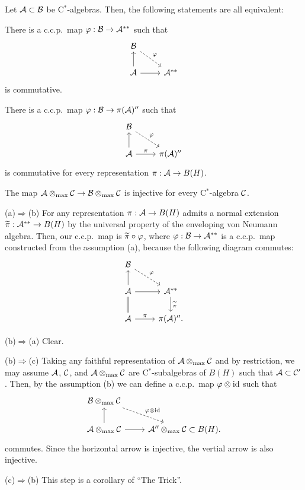 \documentclass{../../small}
\begin{document}
\begin{cor}
Let $\mathcal{A}\subset\mathcal{B}$ be C$^*$-algebras.
Then, the following statements are all equivalent:
\begin{parts}
\item There is a c.c.p.~map $\varphi:\mathcal{B}\to\mathcal{A}^{**}$ such that
\[\begin{tikzcd}
\cB\ar[dashed]{dr}{\f}&\\
\cA\ar{u}\ar{r}&\cA^{**}
\end{tikzcd}\]
is commutative.
\item There is a c.c.p.~map $\varphi:\mathcal{B}\to\pi(\mathcal{A})''$ such that
\[\begin{tikzcd}
\cB\ar[dashed]{dr}{\f}&\\
\cA\ar{u}\ar{r}{\pi}&\pi(\cA)''
\end{tikzcd}\]
is commutative for every representation $\pi:\mathcal{A}\to B(H)$.
\item The map $\mathcal{A}\otimes_{\max}\mathcal{C}\to\mathcal{B}\otimes_{\max}\mathcal{C}$ is injective for every C$^*$-algebra $\mathcal{C}$.
\end{parts}
\end{cor}
\begin{pf}
(a)$\Rightarrow$(b)
For any representation $\pi:\mathcal{A}\to B(H)$ admits a normal extension $\widetilde\pi:\mathcal{A}^{**}\to B(H)$ by the universal property of the enveloping von Neumann algebra.
Then, our c.c.p.~map is $\widetilde\pi\circ\varphi$, where $\varphi:\mathcal{B}\to\mathcal{A}^{**}$ is a c.c.p.~map constructed from the assumption (a), because the following diagram commutes:
\[\begin{tikzcd}
\cB\ar[dashed]{dr}{\f}&\\
\cA\ar{u}\ar{r}&\cA^{**}\ar{d}{\tilde\pi}\\
\cA\ar[equal]{u}\ar{r}{\pi}&\pi(\cA)''.
\end{tikzcd}\]

(b)$\Rightarrow$(a)
Clear.

(b)$\Rightarrow$(c)
Taking any faithful representation of $\mathcal{A}\otimes_{\max}\mathcal{C}$ and by restriction, we may assume $\mathcal{A}$, $\mathcal{C}$, and $\mathcal{A}\otimes_{\max}\mathcal{C}$ are C$^*$-subalgebras of $B(H)$ such that $\mathcal{A}\subset\mathcal{C}'$.
Then, by the assumption (b) we can define a c.c.p.~map $\varphi\otimes\operatorname{id}$ such that
\[\begin{tikzcd}
\cB\otimes_{\max}\cC\ar[dashed]{dr}{\f\otimes\id}&\\
\cA\otimes_{\max}\cC\ar{u}\ar{r}&\cA''\otimes_{\max}\cC\subset B(H).
\end{tikzcd}\]
commutes.
Since the horizontal arrow is injective, the vertial arrow is also injective.

(c)$\Rightarrow$(b)
This step is a corollary of ``The Trick''.
\end{pf}
\end{document}
